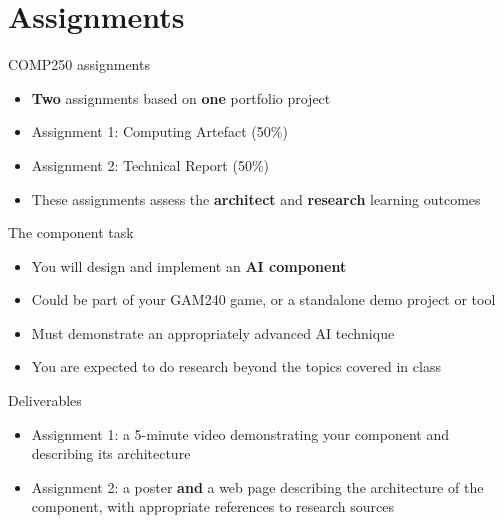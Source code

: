 \part{Assignments}
\frame{\partpage}

\begin{frame}{COMP250 assignments}
	\begin{itemize}
		\pause\item \textbf{Two} assignments based on \textbf{one} portfolio project
		\pause\item Assignment 1: Computing Artefact (50\%)
		\pause\item Assignment 2: Technical Report (50\%)
		\pause\item These assignments assess the \textbf{architect} and \textbf{research} learning outcomes
	\end{itemize}
\end{frame}

\begin{frame}{The component task}
    \begin{itemize}
		\pause\item You will design and implement an \textbf{AI component}
		\pause\item Could be part of your GAM240 game, or a standalone demo project or tool
		\pause\item Must demonstrate an appropriately advanced AI technique
		\pause\item You are expected to do research beyond the topics covered in class
	\end{itemize}
\end{frame}

\begin{frame}{Deliverables}
    \begin{itemize}
		\pause\item Assignment 1: a 5-minute video demonstrating your component and describing its architecture
		\pause\item Assignment 2: a poster \textbf{and} a web page describing the architecture of the component,
			with appropriate references to research sources
	\end{itemize}
\end{frame}

